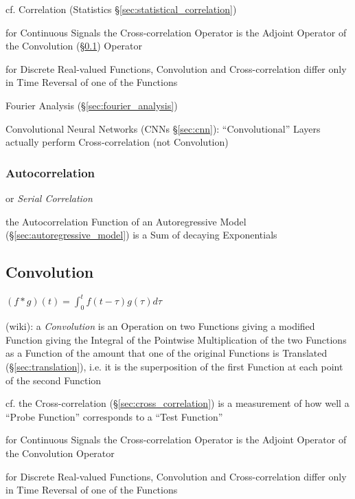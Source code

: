 \fist cf. Correlation (Statistics \S\ref{sec:statistical_correlation})

for Continuous Signals the Cross-correlation Operator is the Adjoint Operator
of the Convolution (\S\ref{sec:convolution}) Operator

for Discrete Real-valued Functions, Convolution and Cross-correlation differ
only in Time Reversal of one of the Functions

\fist Fourier Analysis (\S\ref{sec:fourier_analysis})

Convolutional Neural Networks (CNNs \S\ref{sec:cnn}): ``Convolutional'' Layers
actually perform Cross-correlation (not Convolution)



\subsubsection{Autocorrelation}\label{sec:autocorrelation}

or \emph{Serial Correlation}

\fist the Autocorrelation Function of an Autoregressive Model
(\S\ref{sec:autoregressive_model}) is a Sum of decaying Exponentials



\subsection{Convolution}\label{sec:convolution}

$(f * g)(t) = \int_0^t f(t-\tau) g(\tau) d\tau$

(wiki): a \emph{Convolution} is an Operation on two Functions giving a modified
Function giving the Integral of the Pointwise Multiplication of the two
Functions as a Function of the amount that one of the original Functions is
Translated (\S\ref{sec:translation}), i.e. it is the superposition of the first
Function at each point of the second Function

cf. the Cross-correlation (\S\ref{sec:cross_correlation}) is a measurement of
how well a ``Probe Function'' corresponds to a ``Test Function''

for Continuous Signals the Cross-correlation Operator is the Adjoint Operator of
the Convolution Operator

for Discrete Real-valued Functions, Convolution and Cross-correlation differ
only in Time Reversal of one of the Functions

